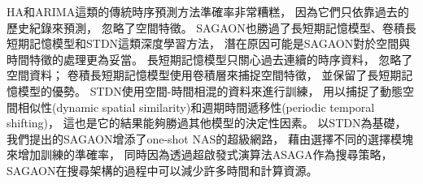 \documentclass[a4paper,14pt]{extarticle}
\begin{document}
                HA和ARIMA這類的傳統時序預測方法準確率非常糟糕，
                因為它們只依靠過去的歷史紀錄來預測，
                忽略了空間特徵。
                SAGAON也勝過了長短期記憶模型、卷積長短期記憶模型和STDN這類深度學習方法，
                潛在原因可能是SAGAON對於空間與時間特徵的處理更為妥當。
                長短期記憶模型只關心過去連續的時序資料，
                忽略了空間資料；
                卷積長短期記憶模型使用卷積層來捕捉空間特徵，
                並保留了長短期記憶模型的優勢。
                STDN使用空間-時間相混的資料來進行訓練，
                用以捕捉了動態空間相似性(dynamic spatial similarity)和週期時間遞移性(periodic temporal shifting)，
                這也是它的結果能夠勝過其他模型的決定性因素。
                以STDN為基礎，
                我們提出的SAGAON增添了one-shot NAS的超級網路，
                藉由選擇不同的選擇模塊來增加訓練的準確率，
                同時因為透過超啟發式演算法ASAGA作為搜尋策略，
                SAGAON在搜尋架構的過程中可以減少許多時間和計算資源。
\end{document}
